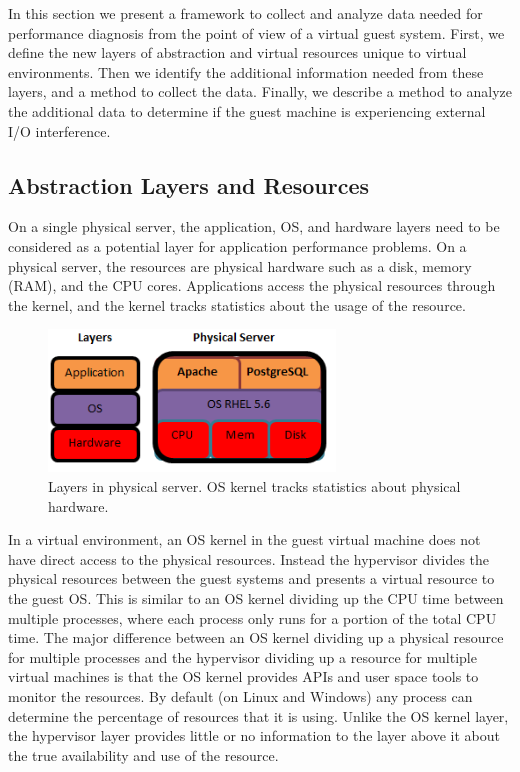 In this section we present a framework to collect and analyze data needed for performance diagnosis from the point of view of a virtual guest system. 
First, we define the new layers of abstraction and virtual resources unique to virtual environments.  
Then we identify the additional information needed from these layers, and a method to collect the data.
Finally, we describe a method to analyze the additional data to determine if the guest machine is experiencing external I/O interference.

\subsection{Abstraction Layers and Resources}
On a single physical server, the application, OS, and hardware layers need to be considered as a potential layer for application performance problems.  On a physical server, the resources are physical hardware such as a disk, memory (RAM), and the CPU cores.  Applications access the physical resources through the kernel, and the kernel tracks statistics about the usage of the resource.

\begin{figure}[!h]
  \includegraphics[width=3in]{images/LayersPhysical.png}
  \caption{Layers in physical server.  OS kernel tracks statistics about physical hardware.}
  \label{PhysicalLayers}
\end{figure}

In a virtual environment, an OS kernel in the guest virtual machine does not have direct access to the physical resources.  Instead the hypervisor divides the physical resources between the guest systems and presents a virtual resource to the guest OS.  
This is similar to an OS kernel dividing up the CPU time between multiple processes, where each process only runs for a portion of the total CPU time.  
The major difference between an OS kernel dividing up a physical resource for multiple processes and the hypervisor dividing up a resource for multiple virtual machines is that the OS kernel provides APIs and user space tools to monitor the resources.  By default (on Linux and Windows) any process can determine the percentage of resources that it is using.  Unlike the OS kernel layer, the hypervisor layer provides little or no information to the layer above it about the true availability and use of the resource.


